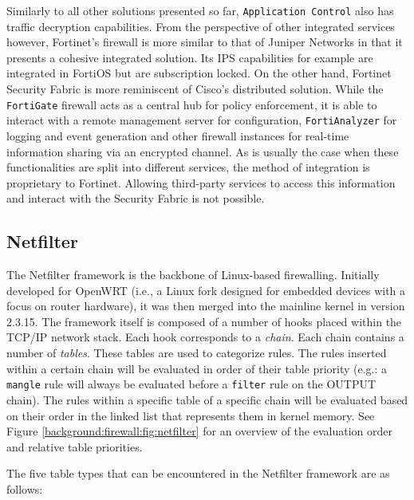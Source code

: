 Similarly to all other solutions presented so far, \texttt{Application Control}
also has traffic decryption capabilities. From the perspective of other integrated
services however, Fortinet's firewall is more similar to that of Juniper Networks
in that it presents a cohesive integrated solution. Its IPS capabilities for
example are integrated in FortiOS but are subscription locked. On the other hand,
Fortinet Security Fabric is more reminiscent of Cisco's distributed solution.
While the \texttt{FortiGate} firewall acts as a central hub for policy enforcement,
it is able to interact with a remote management server for configuration,
\texttt{FortiAnalyzer} for logging and event generation and other firewall
instances for real-time information sharing via an encrypted channel. As is
usually the case when these functionalities are split into different services,
the method of integration is proprietary to Fortinet. Allowing third-party
services to access this information and interact with the Security Fabric is
not possible.

\subsection{Netfilter}

The Netfilter framework is the backbone of Linux-based firewalling. Initially
developed for OpenWRT (i.e., a Linux fork designed for embedded devices with a
focus on router hardware), it was then merged into the mainline kernel in
version 2.3.15. The framework itself is composed of a number of hooks placed
within the TCP/IP network stack. Each hook corresponds to a \textit{chain}.
Each chain contains a number of \textit{tables}. These tables are used to
categorize rules. The rules inserted within a certain chain will be evaluated
in order of their table priority (e.g.: a \texttt{mangle} rule will always be
evaluated before a \texttt{filter} rule on the OUTPUT chain). The rules within
a specific table of a specific chain will be evaluated based on their order
in the linked list that represents them in kernel memory. See Figure
\ref{background:firewall:fig:netfilter} for an overview of the evaluation order
and relative table priorities.

The five table types that can be encountered in the Netfilter framework are as follows:

